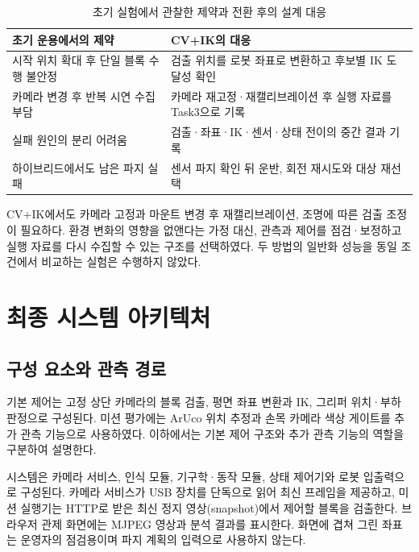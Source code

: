 \begin{table}[htbp]
\centering
\caption{초기 실험에서 관찰한 제약과 전환 후의 설계 대응}
\begin{tabularx}{\linewidth}{@{}YY@{}}
\toprule 초기 운용에서의 제약 & CV+IK의 대응 \\
\midrule
시작 위치 확대 후 단일 블록 수행 불안정 & 검출 위치를 로봇 좌표로 변환하고 후보별 IK 도달성 확인 \\
카메라 변경 후 반복 시연 수집 부담 & 카메라 재고정·재캘리브레이션 후 실행 자료를 Task3으로 기록 \\
실패 원인의 분리 어려움 & 검출·좌표·IK·센서·상태 전이의 중간 결과 기록 \\
하이브리드에서도 남은 파지 실패 & 센서 파지 확인 뒤 운반, 회전 재시도와 대상 재선택 \\
\bottomrule
\end{tabularx}
\end{table}

CV+IK에서도 카메라 고정과 마운트 변경 후 재캘리브레이션, 조명에 따른 검출 조정이 필요하다. 환경 변화의 영향을 없앤다는 가정 대신, 관측과 제어를 점검·보정하고 실행 자료를 다시 수집할 수 있는 구조를 선택하였다. 두 방법의 일반화 성능을 동일 조건에서 비교하는 실험은 수행하지 않았다.
\FloatBarrier

\section{최종 시스템 아키텍처}
\subsection{구성 요소와 관측 경로}
\label{sec:system-config}
기본 제어는 고정 상단 카메라의 블록 검출, 평면 좌표 변환과 IK, 그리퍼 위치·부하 판정으로 구성된다. 미션 평가에는 ArUco 위치 추정과 손목 카메라 색상 게이트를 추가 관측 기능으로 사용하였다. 이하에서는 기본 제어 구조와 추가 관측 기능의 역할을 구분하여 설명한다.

시스템은 카메라 서비스, 인식 모듈, 기구학·동작 모듈, 상태 제어기와 로봇 입출력으로 구성된다. 카메라 서비스가 USB 장치를 단독으로 읽어 최신 프레임을 제공하고, 미션 실행기는 HTTP로 받은 최신 정지 영상(snapshot)에서 제어할 블록을 검출한다. 브라우저 관제 화면에는 MJPEG 영상과 분석 결과를 표시한다. 화면에 겹쳐 그린 좌표는 운영자의 점검용이며 파지 계획의 입력으로 사용하지 않는다.

